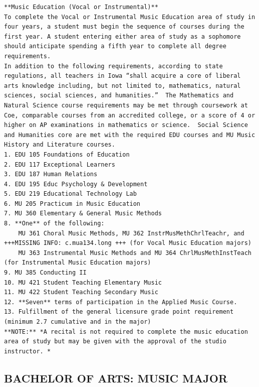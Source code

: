 \documentclass[
  letterpaper,
]{scrbook}
\begin{document}
\begin{verbatim}
**Music Education (Vocal or Instrumental)**
To complete the Vocal or Instrumental Music Education area of study in four years, a student must begin the sequence of courses during the first year. A student entering either area of study as a sophomore should anticipate spending a fifth year to complete all degree requirements. 
In addition to the following requirements, according to state regulations, all teachers in Iowa “shall acquire a core of liberal arts knowledge including, but not limited to, mathematics, natural sciences, social sciences, and humanities.”  The Mathematics and Natural Science course requirements may be met through coursework at Coe, comparable courses from an accredited college, or a score of 4 or higher on AP examinations in mathematics or science.  Social Science and Humanities core are met with the required EDU courses and MU Music History and Literature courses.
1. EDU 105 Foundations of Education
2. EDU 117 Exceptional Learners
3. EDU 187 Human Relations
4. EDU 195 Educ Psychology & Development
5. EDU 219 Educational Technology Lab
6. MU 205 Practicum in Music Education
7. MU 360 Elementary & General Music Methods
8. **One** of the following:
    MU 361 Choral Music Methods, MU 362 InstrMusMethChrlTeachr, and +++MISSING INFO: c.mua134.long +++ (for Vocal Music Education majors)
    MU 363 Instrumental Music Methods and MU 364 ChrlMusMethInstTeach (for Instrumental Music Education majors)
9. MU 385 Conducting II
10. MU 421 Student Teaching Elementary Music
11. MU 422 Student Teaching Secondary Music
12. **Seven** terms of participation in the Applied Music Course.
13. Fulfillment of the general licensure grade point requirement (minimum 2.7 cumulative and in the major) 
**NOTE:** *A recital is not required to complete the music education area of study but may be given with the approval of the studio instructor. *
\end{verbatim}

\subsection{BACHELOR OF ARTS: MUSIC
MAJOR}\label{bachelor-of-arts-music-major}
\end{document}
